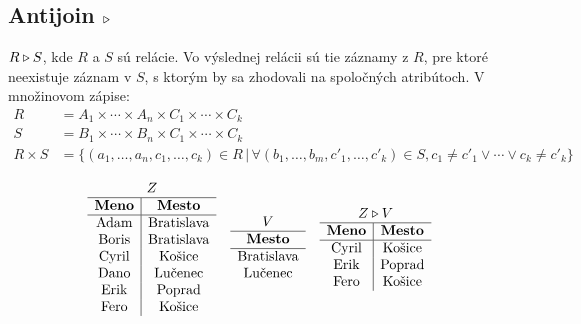 \subsection*{\textbf{Antijoin $\triangleright$}} $R \triangleright S$, kde $R$ a $S$ sú relácie. Vo
výslednej relácii sú tie záznamy z $R$, pre ktoré neexistuje záznam v $S$, s ktorým by sa zhodovali
na spoločných atribútoch. V množinovom zápise: 
    \begin{align*}
        R          &= A_1 \times \cdots \times A_n \times C_1 \times \cdots \times C_k\\
        S          &= B_1 \times \cdots \times B_n \times C_1 \times \cdots \times C_k\\
        R \times S &= \{(a_1, \dots, a_n, c_1, \dots, c_k) \in R \, | \, \forall (b_1, \dots, b_m, c'_1, \dots, c'_k) \in S, c_1 \neq c'_1 \lor \cdots \lor c_k \neq c'_k\}
    \end{align*}
    \begin{priklad}
        \begin{center}
        \[
            \begin{array}{c c c}
                \begin{array}{c|c}
                \multicolumn{2}{c}{Z} \\ \hline
                \textbf{Meno} & \textbf{Mesto} \\ \hline
                \text{Adam}   & \text{Bratislava} \\
                \text{Boris}  & \text{Bratislava} \\
                \text{Cyril}  & \text{Košice}     \\
                \text{Dano}   & \text{Lučenec}    \\
                \text{Erik}   & \text{Poprad}     \\
                \text{Fero}   & \text{Košice}     \\
                \end{array}
                &
                \begin{array}{c}
                \multicolumn{1}{c}{V} \\ \hline
                \textbf{Mesto}    \\ \hline
                \text{Bratislava} \\
                \text{Lučenec}    \\
                \end{array}
                &
                \begin{array}{c|c}
                \multicolumn{2}{c}{Z \Antijoin V} \\ \hline
                \textbf{Meno} & \textbf{Mesto} \\ \hline
                \text{Cyril}  & \text{Košice}     \\
                \text{Erik}   & \text{Poprad}     \\
                \text{Fero}   & \text{Košice}     \\
                \end{array}
            \end{array}
        \]
        \end{center}
    \end{priklad}
    
